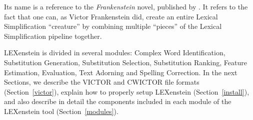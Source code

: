 Its name is a reference to the \textit{Frankenstein} novel, published by \cite{frankenstein}. It refers to the fact that one can, as Victor Frankenstein did, create an entire Lexical Simplification ``creature'' by combining multiple ``pieces'' of the Lexical Simplification pipeline together.

LEXenstein is divided in several modules: Complex Word Identification, Substitution Generation, Substitution Selection, Substitution Ranking, Feature Estimation, Evaluation, Text Adorning and Spelling Correction. In the next Sections, we describe the VICTOR and CWICTOR file formats (Section~\ref{victor}), explain how to properly setup LEXenstein (Section~\ref{install}), and also describe in detail the components included in each module of the LEXenstein tool (Section~\ref{modules}).